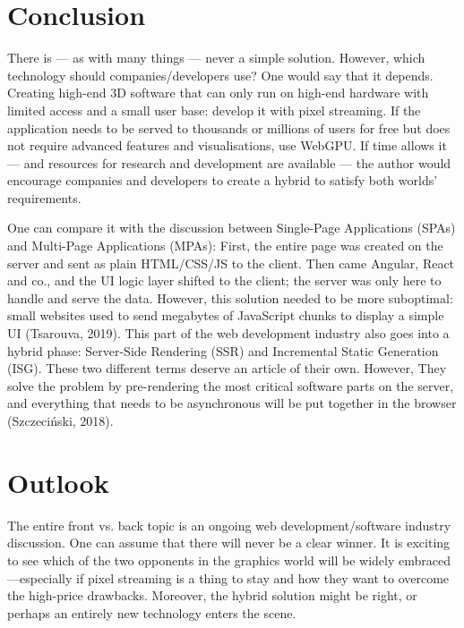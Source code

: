 \documentclass[10pt]{article}
\begin{document}
\begin{sloppypar}
  \section{Conclusion}
  \label{sec:conclusion}

  There is — as with many things — never a simple solution. However, which technology should companies/developers use? One would say that it depends. Creating high-end 3D software that can only run on high-end hardware with limited access and a small user base: develop it with pixel streaming. If the application needs to be served to thousands or millions of users for free but does not require advanced features and visualisations, use WebGPU. If time allows it — and resources for research and development are available — the author would encourage companies and developers to create a hybrid to satisfy both worlds’ requirements.

  One can compare it with the discussion between Single-Page Applications (SPAs) and Multi-Page Applications (MPAs): First, the entire page was created on the server and sent as plain HTML/CSS/JS to the client. Then came Angular, React and co., and the UI logic layer shifted to the client; the server was only here to handle and serve the data. However, this solution needed to be more suboptimal: small websites used to send megabytes of JavaScript chunks to display a simple UI (Tsarouva, 2019). This part of the web development industry also goes into a hybrid phase: Server-Side Rendering (SSR) and Incremental Static Generation (ISG). These two different terms deserve an article of their own. However, They solve the problem by pre-rendering the most critical software parts on the server, and everything that needs to be asynchronous will be put together in the browser (Szczeciński, 2018).

  \section{Outlook}
  \label{sec:outlook}

  The entire front vs. back topic is an ongoing web development/software industry discussion. One can assume that there will never be a clear winner. It is exciting to see which of the two opponents in the graphics world will be widely embraced—especially if pixel streaming is a thing to stay and how they want to overcome the high-price drawbacks. Moreover, the hybrid solution might be right, or perhaps an entirely new technology enters the scene.


  \pagebreak
  
  

\end{sloppypar}
\end{document}
